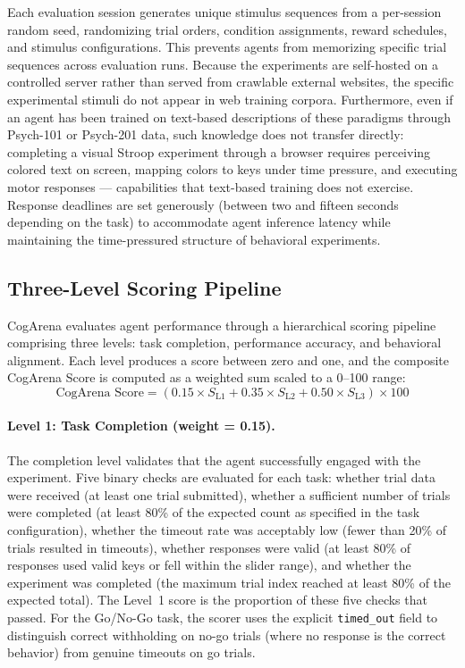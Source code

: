 \documentclass{article}
\begin{document}
Each evaluation session generates unique stimulus sequences from a per-session random seed, randomizing trial orders, condition assignments, reward schedules, and stimulus configurations. This prevents agents from memorizing specific trial sequences across evaluation runs. Because the experiments are self-hosted on a controlled server rather than served from crawlable external websites, the specific experimental stimuli do not appear in web training corpora. Furthermore, even if an agent has been trained on text-based descriptions of these paradigms through Psych-101 or Psych-201 data, such knowledge does not transfer directly: completing a visual Stroop experiment through a browser requires perceiving colored text on screen, mapping colors to keys under time pressure, and executing motor responses --- capabilities that text-based training does not exercise. Response deadlines are set generously (between two and fifteen seconds depending on the task) to accommodate agent inference latency while maintaining the time-pressured structure of behavioral experiments.

\subsection{Three-Level Scoring Pipeline}
\label{sec:scoring}

CogArena evaluates agent performance through a hierarchical scoring pipeline comprising three levels: task completion, performance accuracy, and behavioral alignment. Each level produces a score between zero and one, and the composite CogArena Score is computed as a weighted sum scaled to a 0--100 range:
\begin{equation}
\text{CogArena Score} = \left(0.15 \times S_{\text{L1}} + 0.35 \times S_{\text{L2}} + 0.50 \times S_{\text{L3}}\right) \times 100
\label{eq:composite}
\end{equation}

\paragraph{Level 1: Task Completion (weight = 0.15).}

The completion level validates that the agent successfully engaged with the experiment. Five binary checks are evaluated for each task: whether trial data were received (at least one trial submitted), whether a sufficient number of trials were completed (at least 80\% of the expected count as specified in the task configuration), whether the timeout rate was acceptably low (fewer than 20\% of trials resulted in timeouts), whether responses were valid (at least 80\% of responses used valid keys or fell within the slider range), and whether the experiment was completed (the maximum trial index reached at least 80\% of the expected total). The Level~1 score is the proportion of these five checks that passed. For the Go/No-Go task, the scorer uses the explicit \texttt{timed\_out} field to distinguish correct withholding on no-go trials (where no response is the correct behavior) from genuine timeouts on go trials.
\end{document}
